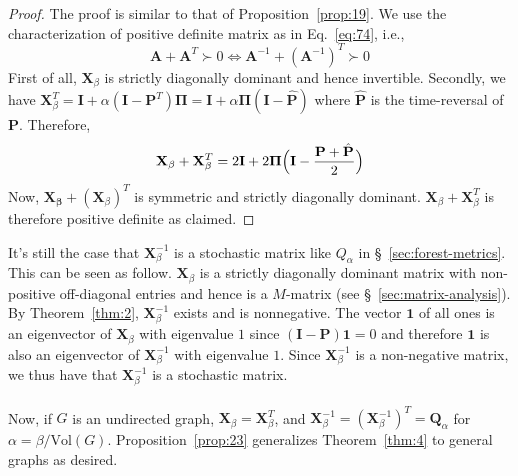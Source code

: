 \begin{proof}
  The proof is similar to that of Proposition~\ref{prop:19}.  We use
  the characterization of positive definite matrix as in
  Eq.~\eqref{eq:74}, i.e.,
  \begin{equation*}
    \mathbf{A} + \mathbf{A}^{T} \succ 0 \Leftrightarrow
    \mathbf{A}^{-1} + (\mathbf{A}^{-1})^{T} \succ 0
  \end{equation*}
  First of all, $\mathbf{X}_{\beta}$ is strictly diagonally dominant
  and hence invertible. Secondly, we have $\mathbf{X}_{\beta}^{T} =
  \mathbf{I} + \alpha (\mathbf{I} - \mathbf{P}^{T}) \bm{\Pi} =
  \mathbf{I} + \alpha \bm{\Pi} (\mathbf{I} - \hat{\mathbf{P}})$ where
  $\hat{\mathbf{P}}$ is the time-reversal of $\mathbf{P}$. Therefore, 
  \begin{equation}
    \label{eq:82}
    \mathbf{X}_{\beta} + \mathbf{X}_{\beta}^{T} = 2 \mathbf{I}
    + 2 \bm{\Pi}\Bigl(\mathbf{I} - \frac{\mathbf{P} + \hat{\mathbf{P}}}{2}
    \Bigr)
  \end{equation}
  Now, $\mathbf{X_{\beta}} + (\mathbf{X}_{\beta})^{T}$ is symmetric and
  strictly diagonally dominant. $\mathbf{X}_\beta +
  \mathbf{X}_{\beta}^{T}$ is therefore positive definite as claimed.  
\end{proof}
It's still the case that $\mathbf{X}_{\beta}^{-1}$ is a stochastic
matrix like $Q_{\alpha}$ in \S~\ref{sec:forest-metrics}. This can be seen as
follow. $\mathbf{X}_{\beta}$ is a strictly diagonally dominant matrix
with non-positive off-diagonal entries and hence is a $M$-matrix (see
\S~\ref{sec:matrix-analysis}). By
Theorem~\ref{thm:2}, $\mathbf{X}_{\beta}^{-1}$ exists and is
nonnegative. The vector $\bm{1}$ of all ones is an eigenvector of
$\mathbf{X}_{\beta}$ with eigenvalue $1$ since $(\mathbf{I} -
\mathbf{P})\bm{1} = 0$ and therefore $\bm{1}$ is also an eigenvector
of $\mathbf{X}_{\beta}^{-1}$ with eigenvalue $1$. Since
$\mathbf{X}_{\beta}^{-1}$ is a non-negative matrix, we thus have that
$\mathbf{X}_{\beta}^{-1}$ is a stochastic
matrix. \\ \\
% 
% 
Now, if $G$ is an undirected graph, $\mathbf{X}_{\beta} =
\mathbf{X}_{\beta}^{T}$, and $\mathbf{X}_{\beta}^{-1} =
(\mathbf{X}_{\beta}^{-1})^{T} = \mathbf{Q}_{\alpha}$ for $\alpha =
\beta/\mathrm{Vol}(G)$. Proposition~\ref{prop:23} generalizes
Theorem~\ref{thm:4} to general graphs as desired.

